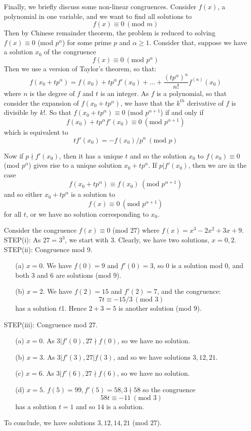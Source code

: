 Finally, we briefly discuss some non-linear congruences. Consider $f(x)$, a polynomial in one variable, and we want to find all solutions to $$f(x) \equiv 0~(\text{mod } m)$$ Then by Chinese remainder theorem, the problem is reduced to solving $f(x) \equiv 0$ (mod $p^\alpha$) for some prime $p$ and $\alpha \ge 1$.
Consider that, suppose we have a solution $x_0$ of the congruence
$$f(x) \equiv 0~(\text{mod } p^\alpha)$$ Then we use a version of Taylor's theorem, so that:
$$f(x_0+tp^\alpha) = f(x_0)+tp^\alpha f'(x_0) +\ldots + \frac{(tp^\alpha)^n}{n!}f^{(n)}(x_0)$$
where $n$ is the degree of $f$ and $t$ is an integer. As $f$ is a polynomial, so that consider the expansion of $f(x_0 +tp^\alpha)$, we have that the $k^{th}$ derivative of $f$ is divisible by $k!$. So that $f(x_0+tp^\alpha) \equiv 0$ (mod $p^{\alpha+1}$) if and only if
$$ f(x_0)+tp^\alpha f'(x_0) \equiv 0~(\text{mod } p^{\alpha+1})$$ which is equivalent to
$$tf'(x_0)=-f(x_0)/p^\alpha~(\text{mod } p)$$

Now if $p \nmid f'(x_0)$, then it has a unique $t$ and so the solution $x_0$ to $f(x_0) \equiv 0$ (mod $p^\alpha$) gives rise to a unique solution $x_0+tp^\alpha$. If $p|f'(x_0)$, then we are in the case
$$f(x_0+tp^\alpha) \equiv f(x_0)~(\text{mod } p^{\alpha+1})$$ and so either $x_0+tp^\alpha$ is a solution to
$$f(x) \equiv 0~(\text{mod } p^{\alpha+1})$$ for all $t$, or we have no solution corresponding to $x_0$.

\begin{example} Consider the congruence $f(x) \equiv 0$ (mod $27$) where $f(x)=x^3-2x^2+3x+9$.\\
STEP(i): As $27=3^3$, we start with $3$. Clearly, we have two solutions, $x=0,2$.\\
STEP(ii): Congruence mod 9.
\begin{enumerate}
\item[(a)] $x=0$. We have $f(0)=9$ and $f'(0)=3$, so $0$ is a solution mod $0$, and both $3$ and $6$ are solutions (mod 9).
\item[(b)] $x=2$. We have $f(2)=15$ and $f'(2)=7$, and the congruence:
$$ 7t \equiv -15/3~(\text{mod } 3)$$ has a solution $t$1. Hence $2+3=5$ is another solution (mod $9$).
\end{enumerate}
STEP(iii): Congruence mod $27$.
\begin{enumerate}
\item[(a)] $x=0$. As $3|f'(0), 27 \nmid f(0)$, so we have no solution.
\item[(b)] $x=3$. As $3|f'(3), 27|f(3)$, and so we have solutions $3,12,21$.
\item[(c)] $x=6$. As $3|f'(6), 27 \nmid f(6)$, so we have no solution.
\item[(d)] $x=5$. $f(5)=99, f'(5)=58, 3 \nmid 58$ so the congruence
$$58t \equiv -11~(\text{mod } 3)$$ has a solution $t=1$ and so $14$ is a solution.
\end{enumerate}
To conclude, we have solutions $3,12,14,21$ (mod $27$).
\end{example}
